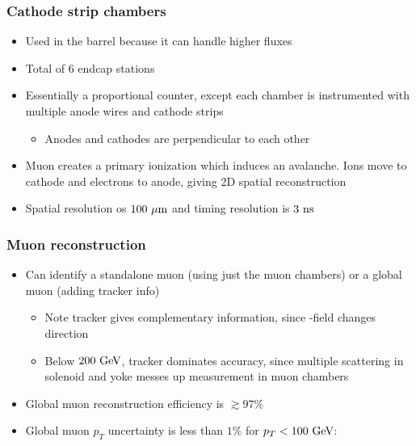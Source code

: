 \subsubsection{Cathode strip chambers}
\begin{itemize}
  \item Used in the barrel because it can handle higher fluxes
  \item Total of 6 endcap stations
  \item Essentially a proportional counter, except each chamber is instrumented with multiple anode wires and cathode strips
  \begin{itemize}
    \item Anodes and cathodes are perpendicular to each other
  \end{itemize}
  \item Muon creates a primary ionization which induces an avalanche. Ions move to cathode and electrons to anode, giving 2D spatial reconstruction
  \item Spatial resolution os $100~\mu\text{m}$ and timing resolution is $3~\text{ns}$
\end{itemize}

\subsubsection{Muon reconstruction}
\begin{itemize}
  \item Can identify a standalone muon (using just the muon chambers) or a global muon (adding tracker info)
  \begin{itemize}
    \item Note tracker gives complementary information, since \B-field changes direction
    \item Below $200~\text{GeV}$, tracker dominates accuracy, since multiple scattering in solenoid and yoke messes up measurement in muon chambers
  \end{itemize}
  \item Global muon reconstruction efficiency is $\gtrsim 97\%$
  \item Global muon $p_T$ uncertainty is less than $1\%$ for $p_T<100~\text{GeV}$:
\end{itemize}

